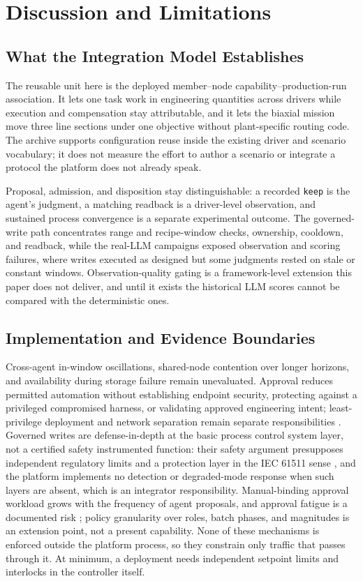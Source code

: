 \section{Discussion and Limitations}
\label{sec:limits}
\subsection{What the Integration Model Establishes}
The reusable unit here is the deployed member--node capability--production-run
association. It lets one task work in engineering quantities across drivers while
execution and compensation stay attributable, and it lets the biaxial mission move
three line sections under one objective without plant-specific routing code. The
archive supports configuration reuse inside the existing driver and scenario
vocabulary; it does not measure the effort to author a scenario or integrate a
protocol the platform does not already speak.

Proposal, admission, and disposition stay distinguishable: a recorded
\texttt{keep} is the agent's judgment, a matching
readback is a driver-level observation, and sustained process convergence is a
separate experimental outcome. The governed-write path concentrates range and
recipe-window checks, ownership, cooldown, and readback, while the real-LLM
campaigns exposed observation and scoring failures, where writes executed as
designed but some judgments rested on
stale or constant windows. Observation-quality gating is a framework-level
extension this paper does not deliver, and until it exists the historical LLM
scores cannot be compared with the deterministic ones.

\subsection{Implementation and Evidence Boundaries}
Cross-agent in-window oscillations, shared-node
contention over longer horizons, and availability during storage failure remain
unevaluated. Approval reduces permitted automation without establishing endpoint security,
protecting against a privileged compromised harness, or validating approved
engineering intent; least-privilege deployment and network separation remain
separate responsibilities \cite{iec62443,nist80082}. Governed writes are
defense-in-depth at the basic process control system layer, not a certified safety
instrumented function: their safety argument presupposes independent regulatory
limits and a protection layer in the IEC 61511 sense \cite{iec61511}, and the
platform implements no detection or degraded-mode response when such layers are
absent, which is an integrator responsibility. Manual-binding approval workload
grows with the frequency of agent proposals, and approval fatigue is a documented
risk \cite{parasuraman2000model,bainbridge1983ironies}; policy granularity over
roles, batch phases, and magnitudes is an extension point, not a present
capability. None of these mechanisms is enforced outside the platform process, so
they constrain only traffic that passes through it. At minimum, a deployment needs
independent setpoint limits and interlocks in the controller itself.

